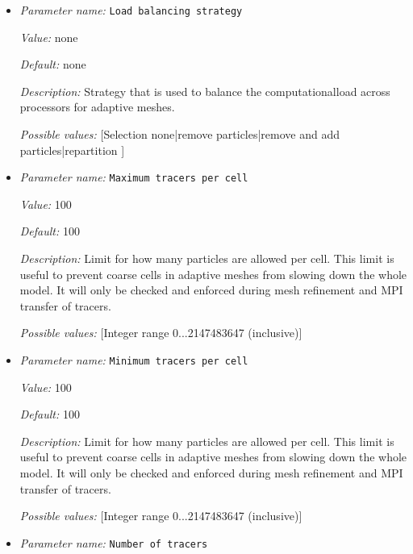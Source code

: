 \begin{itemize}
{\it Possible values:} [MultipleSelection function|initial composition|initial position|pT path|position|velocity ]
\item {\it Parameter name:} {\tt Load balancing strategy}
\label{parameters:Postprocess/Tracers/Load balancing strategy}


{\it Value:} none


{\it Default:} none


{\it Description:} Strategy that is used to balance the computationalload across processors for adaptive meshes.


{\it Possible values:} [Selection none|remove particles|remove and add particles|repartition ]
\item {\it Parameter name:} {\tt Maximum tracers per cell}
\label{parameters:Postprocess/Tracers/Maximum tracers per cell}


{\it Value:} 100


{\it Default:} 100


{\it Description:} Limit for how many particles are allowed per cell. This limit is useful to prevent coarse cells in adaptive meshes from slowing down the whole model. It will only be checked and enforced during mesh refinement and MPI transfer of tracers.


{\it Possible values:} [Integer range 0...2147483647 (inclusive)]
\item {\it Parameter name:} {\tt Minimum tracers per cell}
\label{parameters:Postprocess/Tracers/Minimum tracers per cell}


{\it Value:} 100


{\it Default:} 100


{\it Description:} Limit for how many particles are allowed per cell. This limit is useful to prevent coarse cells in adaptive meshes from slowing down the whole model. It will only be checked and enforced during mesh refinement and MPI transfer of tracers.


{\it Possible values:} [Integer range 0...2147483647 (inclusive)]
\item {\it Parameter name:} {\tt Number of tracers}
\label{parameters:Postprocess/Tracers/Number of tracers}



\end{itemize}
